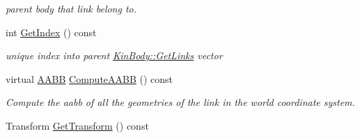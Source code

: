 \begin{DoxyCompactItemize}
\begin{DoxyCompactList}\small\item\em parent body that link belong to. \item\end{DoxyCompactList}\item 
\hypertarget{classOpenRAVE_1_1KinBody_1_1Link_a75ee2e62d9d1cb0e02f76db0ea981967}{
int \hyperlink{classOpenRAVE_1_1KinBody_1_1Link_a75ee2e62d9d1cb0e02f76db0ea981967}{GetIndex} () const }
\label{classOpenRAVE_1_1KinBody_1_1Link_a75ee2e62d9d1cb0e02f76db0ea981967}

\begin{DoxyCompactList}\small\item\em unique index into parent \hyperlink{classOpenRAVE_1_1KinBody_a32ba11c03aabb873b3e503c8e5b93e53}{KinBody::GetLinks} vector \item\end{DoxyCompactList}\item 
\hypertarget{classOpenRAVE_1_1KinBody_1_1Link_a19007e9a11f60fac50720cd38a4d6ede}{
virtual \hyperlink{classOpenRAVE_1_1geometry_1_1aabb}{AABB} \hyperlink{classOpenRAVE_1_1KinBody_1_1Link_a19007e9a11f60fac50720cd38a4d6ede}{ComputeAABB} () const }
\label{classOpenRAVE_1_1KinBody_1_1Link_a19007e9a11f60fac50720cd38a4d6ede}

\begin{DoxyCompactList}\small\item\em Compute the aabb of all the geometries of the link in the world coordinate system. \item\end{DoxyCompactList}\item 
\hypertarget{classOpenRAVE_1_1KinBody_1_1Link_a86547f5ece146c65832bab4395226789}{
Transform \hyperlink{classOpenRAVE_1_1KinBody_1_1Link_a86547f5ece146c65832bab4395226789}{GetTransform} () const }
\label{classOpenRAVE_1_1KinBody_1_1Link_a86547f5ece146c65832bab4395226789}


\end{DoxyCompactItemize}

